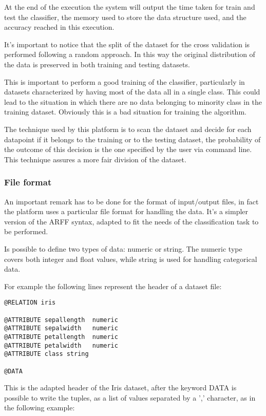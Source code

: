 \documentclass{acm_proc_article-sp-sigmod07}
\begin{document}
At the end of the execution the system will output the time taken for
train and test the classifier, the memory used to store the data structure
used, and the accuracy reached in this execution.

It's important to notice that the split of the dataset for the cross
validation is performed following a random approach. In this way the
original distribution of the data is preserved in both training and
testing datasets.

This is important to perform a good training of the classifier,
particularly in datasets characterized by having most of the data all in a
single class. This could lead to the situation in which there are no data
belonging to minority class in the training dataset.
Obviously this is a bad situation for training the algorithm.

The technique used by this platform is to scan the dataset and decide for
each datapoint if it belongs to the training or to the testing dataset,
the probability of the outcome of this decision is the one specified by
the user via command line.
This technique assures a more fair division of the dataset.

\subsubsection{File format}
An important remark has to be done for the format of input/output files,
in fact the platform uses a particular file format for handling the data.
It's a simpler version of the ARFF syntax, adapted to fit the needs of the
classification task to be performed.

Is possible to define two types of data: numeric or string. The numeric
type covers both integer and float values, while string is used for
handling categorical data.

For example the following lines represent the header of a dataset file:

\begin{verbatim}
@RELATION iris

@ATTRIBUTE sepallength	numeric
@ATTRIBUTE sepalwidth 	numeric
@ATTRIBUTE petallength 	numeric
@ATTRIBUTE petalwidth	numeric
@ATTRIBUTE class string 

@DATA
\end{verbatim}

This is the adapted header of the Iris dataset, after the keyword DATA
is possible to write the tuples, as a list of values separated by a ','
character, as in the following example:
\end{document}
